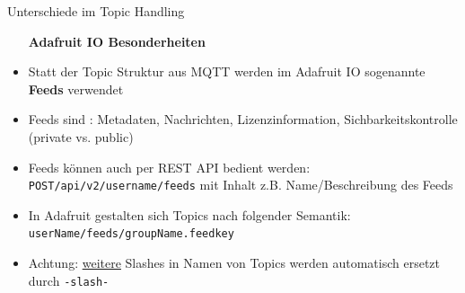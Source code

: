 \begin{frame}{Unterschiede im Topic Handling}
    \begin{itemize}
        \setlength{\itemindent}{1.6in}
        \item [\textbf{Adafruit IO Besonderheiten}]
    \end{itemize}
    \begin{itemize}
        \item Statt der Topic Struktur aus MQTT werden im Adafruit IO sogenannte  \textbf{Feeds} verwendet \cite{io.adafruit.com/api/docs}
        \item Feeds sind : Metadaten, Nachrichten, Lizenzinformation, Sichbarkeitskontrolle (private vs. public)
        \item Feeds können auch per REST API bedient werden:  \texttt{POST/api/v2/{username}/feeds} mit Inhalt z.B. Name/Beschreibung des Feeds
        \item In Adafruit gestalten sich Topics nach folgender Semantik: \texttt{userName/feeds/groupName.feedkey} \cite{Adafruit und MQTT Topics}
        \item Achtung: \underline{weitere} Slashes in Namen von Topics werden automatisch ersetzt durch \texttt{-slash-}
    \end{itemize}    
\end{frame}

